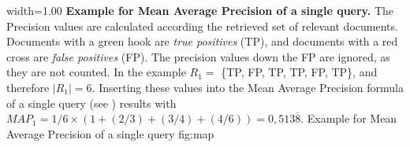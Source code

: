       {width=1.00\textwidth}
      {\textbf{Example for Mean Average Precision of a single query.} The Precision values are calculated according the retrieved set of relevant documents. Documents with a green hook are \textit{true positives} (TP), and documents with a red cross are \textit{false positives} (FP). The precision values down the FP are ignored, as they are not counted. In the example $R_1 =$ \{TP, FP, TP, TP, FP, TP\}, and therefore $|R_1| = 6$. Inserting these values into the Mean Average Precision formula of a single query (see ) results with $\mathit{MAP}_1 = 1/6 \times (1 + (2/3) + (3/4) + (4/6)) = 0,513\overline{8}$.}
      {Example for Mean Average Precision of a single query}
      {fig:map}
